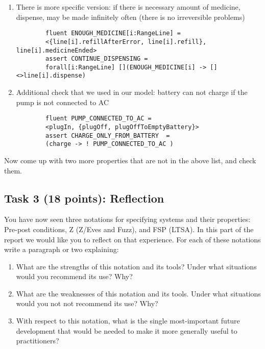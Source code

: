 \documentclass{article}
\newcommand{\head}{\subsection*}
\begin{document}
\begin{enumerate}
\begin{itemize}
\begin{enumerate}
    	 \item There is more specific version: if there is necessary amount of medicine, dispense, may be made infinitely
    	 often (there is no irreversible problems)
    	 
    	 \begin{verbatim}
    	fluent ENOUGH_MEDICINE[i:RangeLine] =
    	<{line[i].refillAfterError, line[i].refill}, line[i].medicineEnded>
    	assert CONTINUE_DISPENSING =
    	forall[i:RangeLine] [](ENOUGH_MEDICINE[i] -> [] <>line[i].dispense)
    	\end{verbatim}
    	
    	\item Additional check that we used in our model: battery can not charge if the pump is not connected to AC
    	
    	 \begin{verbatim}
    	fluent PUMP_CONNECTED_TO_AC =
    	<plugIn, {plugOff, plugOffToEmptyBattery}>
    	assert CHARGE_ONLY_FROM_BATTERY  = 
    	(charge -> ! PUMP_CONNECTED_TO_AC )
    	\end{verbatim}
    	\end{enumerate}
    	\end{itemize}
    	    
\end{enumerate}

Now come up with two more properties that are not in the above list, and check them.
\head{Task 3 (18 points): Reflection}

 You have now seen three notations for specifying systems and their properties: Pre-post conditions,
 Z (Z/Eves and Fuzz), and FSP (LTSA).  In this part of the report we would like you to reflect on that experience.
 For each of these notations write a paragraph or two explaining:
\begin{enumerate}
 \item What are the strengths of this notation and its tools?  Under what situations would you
recommend its use? Why?
 \item What are the weaknesses of this notation and its tools. Under what
situations would you not not recommend its use? Why?
 \item With respect to this notation, what is
the single most-important future development that would be needed to make it more generally useful
to practitioners?
\end{enumerate}
\end{document}
